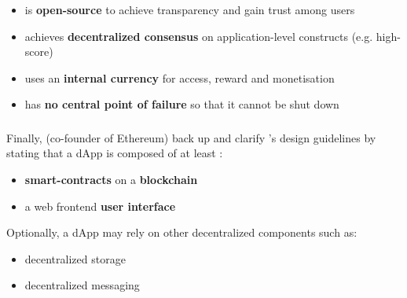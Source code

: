  \begin{itemize}
  \item is \textbf{open-source} to achieve transparency and gain trust among users 
  \item achieves \textbf{decentralized consensus} on application-level constructs (e.g. high-score)
  \item uses an \textbf{internal currency} for access, reward and monetisation
  \item has \textbf{no central point of failure} so that it cannot be shut down
\end{itemize}

\subsubsection{\citeyear{Antonopoulos.2018}}
Finally, \citeauthor{Antonopoulos.2018} (co-founder of Ethereum) back up and clarify \citeauthor{EthereumWhitepaper}'s design guidelines by stating that a \ac{dApp} is composed of at least \cite[p.~34]{Antonopoulos.2018}:

\begin{itemize}
  \item \textbf{smart-contracts} on a \textbf{blockchain}
  \item a web frontend \textbf{user interface}
\end{itemize}

Optionally, a \ac{dApp} may rely on other decentralized components such as:

\begin{itemize}
  \item decentralized storage
  \item decentralized messaging
\end{itemize}



